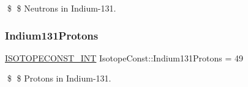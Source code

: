 \$ \$ Neutrons in Indium-\/131. \mbox{\label{group___isotope_const-_indium-_in131_gaac49eb7eaf3cd87a3bb5853c2b3e2609}} 
\subsubsection{\texorpdfstring{Indium131\+Protons}{Indium131Protons}}
{\footnotesize\ttfamily \mbox{\hyperlink{group___isotope_const-_macros_ga5f18360b3e99483a35c32d789e62621c}{I\+S\+O\+T\+O\+P\+E\+C\+O\+N\+S\+T\+\_\+\+I\+NT}} Isotope\+Const\+::\+Indium131\+Protons = 49}

\$ \$ Protons in Indium-\/131. 